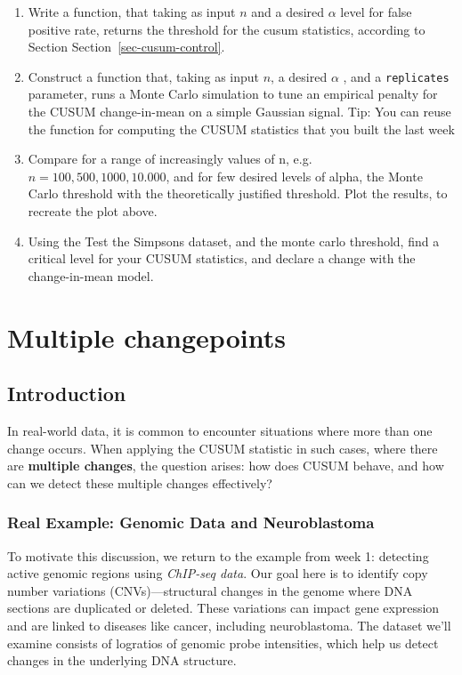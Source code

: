 \documentclass[
  letterpaper,
  DIV=11,
  numbers=noendperiod]{scrreprt}
\begin{document}
\begin{enumerate}
\def\labelenumi{\arabic{enumi}.}
\item
  Write a function, that taking as input \(n\) and a desired \(\alpha\)
  level for false positive rate, returns the threshold for the cusum
  statistics, according to Section Section~\ref{sec-cusum-control}.
\item
  Construct a function that, taking as input \(n\), a desired \(\alpha\)
  , and a \texttt{replicates} parameter, runs a Monte Carlo simulation
  to tune an empirical penalty for the CUSUM change-in-mean on a simple
  Gaussian signal. Tip: You can reuse the function for computing the
  CUSUM statistics that you built the last week
\item
  Compare for a range of increasingly values of n,
  e.g.~\(n = 100, 500, 1000, 10.000\), and for few desired levels of
  alpha, the Monte Carlo threshold with the theoretically justified
  threshold. Plot the results, to recreate the plot above.
\item
  Using the Test the Simpsons dataset, and the monte carlo threshold,
  find a critical level for your CUSUM statistics, and declare a change
  with the change-in-mean model.
\end{enumerate}


\chapter{Multiple changepoints}\label{multiple-changepoints}

\section{Introduction}\label{introduction}

In real-world data, it is common to encounter situations where more than
one change occurs. When applying the CUSUM statistic in such cases,
where there are \textbf{multiple changes}, the question arises: how does
CUSUM behave, and how can we detect these multiple changes effectively?

\subsection{Real Example: Genomic Data and
Neuroblastoma}\label{real-example-genomic-data-and-neuroblastoma}

To motivate this discussion, we return to the example from week 1:
detecting active genomic regions using \emph{ChIP-seq data}. Our goal
here is to identify copy number variations (CNVs)---structural changes
in the genome where DNA sections are duplicated or deleted. These
variations can impact gene expression and are linked to diseases like
cancer, including neuroblastoma. The dataset we'll examine consists of
logratios of genomic probe intensities, which help us detect changes in
the underlying DNA structure.
\end{document}
